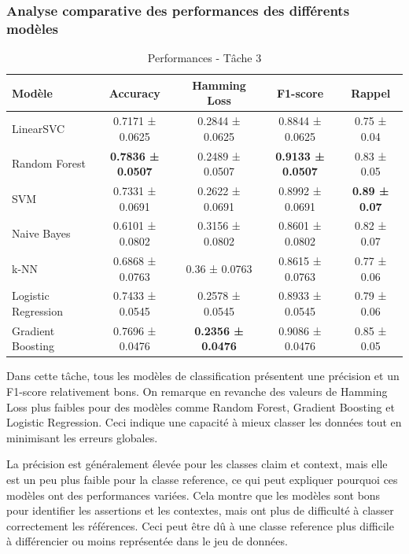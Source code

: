 \subsubsection{Analyse comparative des performances des différents modèles}
\begin{table}[H]
    \centering
    \caption{Performances - Tâche 3}
    \begin{tabular}{lcccc}
        \toprule
        Modèle & Accuracy & Hamming Loss & F1-score & Rappel \\
        \midrule
        LinearSVC & 0.7171 ± 0.0625 & 0.2844 ± 0.0625 & 0.8844 ± 0.0625 & 0.75 ± 0.04 \\
        Random Forest & \textbf{0.7836 ± 0.0507} & 0.2489 ± 0.0507 & \textbf{0.9133 ± 0.0507} & 0.83 ± 0.05 \\
        SVM & 0.7331 ± 0.0691 & 0.2622 ± 0.0691 & 0.8992 ± 0.0691 & \textbf{0.89 ± 0.07} \\
        Naive Bayes & 0.6101 ± 0.0802 & 0.3156 ± 0.0802 & 0.8601 ± 0.0802 & 0.82 ± 0.07 \\
        k-NN & 0.6868 ± 0.0763 & 0.36 ± 0.0763 & 0.8615 ± 0.0763 & 0.77 ± 0.06 \\
        Logistic Regression & 0.7433 ± 0.0545 & 0.2578 ± 0.0545 & 0.8933 ± 0.0545 & 0.79 ± 0.06 \\
        Gradient Boosting & 0.7696 ± 0.0476 & \textbf{0.2356 ± 0.0476} & 0.9086 ± 0.0476 & 0.85 ± 0.05 \\
        \bottomrule
    \end{tabular}\label{tab:model_comparison_clm_ref_context}
\end{table}

Dans cette tâche, tous les modèles de classification présentent une précision et un F1-score relativement bons.
On remarque en revanche des valeurs de Hamming Loss plus faibles pour des modèles comme Random Forest, Gradient Boosting et Logistic Regression.
Ceci indique une capacité à mieux classer les données tout en minimisant les erreurs globales.

\noindent La précision est généralement élevée pour les classes claim et context, mais elle est un peu plus faible pour la classe reference, ce qui peut expliquer pourquoi ces modèles ont des performances variées.
Cela montre que les modèles sont bons pour identifier les assertions et les contextes, mais ont plus de difficulté à classer correctement les références.
Ceci peut être dû à une classe reference plus difficile à différencier ou moins représentée dans le jeu de données.

